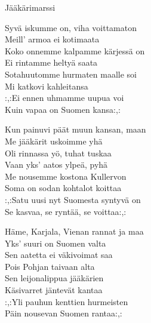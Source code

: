 \begin{song}{Jääkärimarssi}

    Syvä iskumme on, viha voittamaton\\
    Meill' armoa ei kotimaata\\
    Koko onnemme kalpamme kärjessä on\\
    Ei rintamme heltyä saata\\
    Sotahuutomme hurmaten maalle soi\\
    Mi katkovi kahleitansa\\
    :,:Ei ennen uhmamme uupua voi\\
    Kuin vapaa on Suomen kansa:,:

    Kun painuvi päät muun kansan, maan\\
    Me jääkärit uskoimme yhä\\
    Oli rinnassa yö, tuhat tuskaa\\
    Vaan yks' aatos ylpeä, pyhä\\
    Me nousemme kostona Kullervon\\
    Soma on sodan kohtalot koittaa\\
    :,:Satu uusi nyt Suomesta syntyvä on\\
    Se kasvaa, se ryntää, se voittaa:,:

    \columnbreak

    Häme, Karjala, Vienan rannat ja maa\\
    Yks' suuri on Suomen valta\\
    Sen aatetta ei väkivoimat saa\\
    Pois Pohjan taivaan alta\\
    Sen leijonalippua jääkärien\\
    Käsivarret jäntevät kantaa\\
    :,:Yli pauhun kenttien hurmeisten\\
    Päin nousevan Suomen rantaa:,:


\end{song}